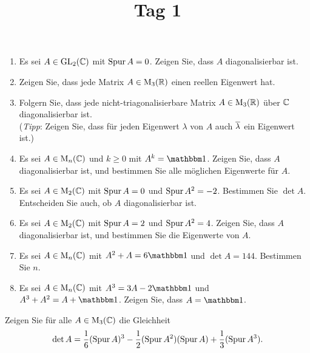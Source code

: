\documentclass[a4paper, 10pt]{scrartcl}
\title{Tag 1}
\author{}
\date{}
\begin{document}
\begin{question}[subtitle = Eigenwerte und Diagonalisierbarkeit]
  \begin{enumerate}
    \item
      Es sei $A \in \operatorname{GL}_{2}(\mathbb{C})$ mit $\operatorname{Spur} A = 0$.
      Zeigen Sie, dass $A$ diagonalisierbar ist.
    \item
      Zeigen Sie, dass jede Matrix $A \in \operatorname{M}_{3}(\mathbb{R})$ einen reellen Eigenwert hat.
    \item
      Folgern Sie, dass jede nicht-triagonalisierbare Matrix $A \in \operatorname{M}_{3}(\mathbb{R})$ über $\mathbb{C}$ diagonalisierbar ist.
      \\
      (\emph{Tipp}:
       Zeigen Sie, dass für jeden Eigenwert $\lambda$ von $A$ auch $\overline{\lambda}$ ein Eigenwert ist.)
    \item
      Es sei $A \in \operatorname{M}_{n}(\mathbb{C})$ und $k \geq 0$ mit $A^k = \Id$.
      Zeigen Sie, dass $A$ diagonalisierbar ist, und bestimmen Sie alle möglichen Eigenwerte für $A$.
    \item
      Es sei $A \in \operatorname{M}_{2}(\mathbb{C})$ mit $\operatorname{Spur} A = 0$ und $\operatorname{Spur} A^2 = -2$.
      Bestimmen Sie $\det A$.
      Entscheiden Sie auch, ob $A$ diagonalisierbar ist.
    \item
      Es sei $A \in \operatorname{M}_{2}(\mathbb{C})$ mit $\operatorname{Spur} A = 2$ und $\operatorname{Spur} A^2 = 4$.
      Zeigen Sie, dass $A$ diagonalisierbar ist, und bestimmen Sie die Eigenwerte von $A$.
    \item
      Es sei $A \in \operatorname{M}_{n}(\mathbb{C})$ mit $A^2 + A = 6 \Id$ und $\det A = 144$.
      Bestimmen Sie $n$.
    \item
      Es sei $A \in \operatorname{M}_{n}(\mathbb{C})$ mit $A^3 = 3A - 2 \Id$ und $A^3 + A^2 = A + \Id$.
      Zeigen Sie, dass $A = \Id$.
  \end{enumerate}
\end{question}





\begin{question}[subtitle = Determinante und Potenzen der Spur]
  Zeigen Sie für alle $A \in \operatorname{M}_{3}(\mathbb{C})$ die Gleichheit
  \[
      \det A
    =   \frac{1}{6} (\operatorname{Spur} A)^3
      - \frac{1}{2} (\operatorname{Spur} A^2)(\operatorname{Spur} A)
      + \frac{1}{3} (\operatorname{Spur} A^3).
  \]
\end{question}
\end{document}
